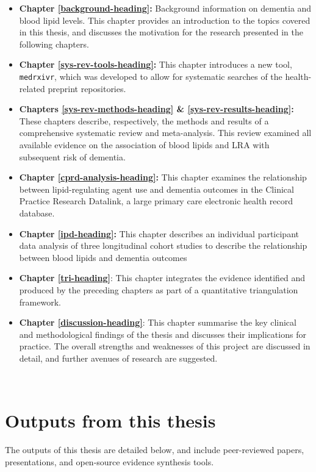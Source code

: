 \documentclass[a4paper, twoside]{templates/ociamthesis}
\providecommand{\tightlist}{%
  \setlength{\itemsep}{0pt}\setlength{\parskip}{0pt}}
\begin{document}
\begin{itemize}
\tightlist
\item
  \textbf{Chapter \ref{background-heading}:} Background information on dementia and blood lipid levels. This chapter provides an introduction to the topics covered in this thesis, and discusses the motivation for the research presented in the following chapters.
\item
  \textbf{Chapter \ref{sys-rev-tools-heading}:} This chapter introduces a new tool, \texttt{medrxivr}, which was developed to allow for systematic searches of the health-related preprint repositories.
\item
  \textbf{Chapters \ref{sys-rev-methods-heading} \& \ref{sys-rev-results-heading}:} These chapters describe, respectively, the methods and results of a comprehensive systematic review and meta-analysis. This review examined all available evidence on the association of blood lipids and LRA with subsequent risk of dementia.
\item
  \textbf{Chapter \ref{cprd-analysis-heading}:} This chapter examines the relationship between lipid-regulating agent use and dementia outcomes in the Clinical Practice Research Datalink, a large primary care electronic health record database.
\item
  \textbf{Chapter \ref{ipd-heading}:} This chapter describes an individual participant data analysis of three longitudinal cohort studies to describe the relationship between blood lipids and dementia outcomes
\item
  \textbf{Chapter \ref{tri-heading}}: This chapter integrates the evidence identified and produced by the preceding chapters as part of a quantitative triangulation framework.
\item
  \textbf{Chapter \ref{discussion-heading}}: This chapter summarise the key clinical and methodological findings of the thesis and discusses their implications for practice. The overall strengths and weaknesses of this project are discussed in detail, and further avenues of research are suggested.
\end{itemize}

~

\hypertarget{thesis-output}{%
\section{Outputs from this thesis}\label{thesis-output}}

The outputs of this thesis are detailed below, and include peer-reviewed papers, presentations, and open-source evidence synthesis tools.
\end{document}
